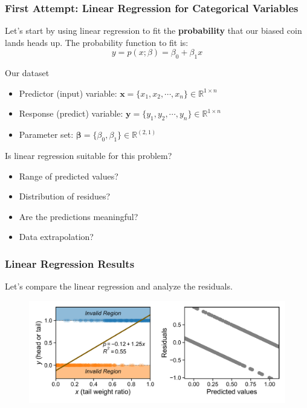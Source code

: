 \documentclass[10pt,aspectratio=169]{beamer}
\begin{document}
\begin{frame}
  \frametitle{First Attempt: Linear Regression for Categorical Variables}

  Let's start by using linear regression to fit the
  \textbf{probability} that our biased coin lands heads up. The
  probability function to fit is:
  \begin{equation*}
    y = p(x; \mathbb{\beta}) = \beta_{0} + \beta_{1} x
  \end{equation*}

  \vfill Our dataset
  \begin{itemize}
  \item Predictor (input) variable:
    $\mathbf{x} = \{x_{1}, x_{2}, \cdots, x_{n}\} \in \mathbb{R}^{1\times{}n}$
  \item Response (predict) variable:
    $\mathbf{y} = \{y_{1}, y_{2}, \cdots, y_{n}\} \in \mathbb{R}^{1\times{}n}$
  \item Parameter set:
    $\mathbf{\beta} = \{\beta_{0}, \beta_{1}\} \in \mathbb{R}^{(2, 1)}$
  \end{itemize}

  \vfill Is linear regression suitable for this problem?
  \begin{itemize}
  \item Range of predicted values?
  \item Distribution of residues?
  \item Are the predictions meaningful?
  \item Data extrapolation?
  \end{itemize}
\end{frame}


\begin{frame}
  \frametitle{Linear Regression Results}
  Let's compare the linear regression and analyze the residuals.
  \begin{figure}
    \centering %
    \hspace*{-0.05\textwidth}%
    \includegraphics[width=1.10\textwidth]{scripts/coin_linear_combined.pdf}
  \end{figure}
\end{frame}
  
\end{document}
